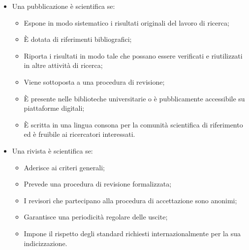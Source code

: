 \begin{itemize}
    \item Una pubblicazione è scientifica se:
        \begin{itemize}
            \item Espone in modo sistematico i risultati originali del lavoro di ricerca;
            \item È dotata di riferimenti bibliografici;
            \item Riporta i risultati in modo tale che possano essere verificati e riutilizzati in altre attività di ricerca;
            \item Viene sottoposta a una procedura di revisione;
            \item È presente nelle biblioteche universitarie o è pubblicamente accessibile su piattaforme digitali;
            \item È scritta in una lingua consona per la comunità scientifica di riferimento ed è fruibile 
            ai ricercatori interessati.

        \end{itemize}
    \item Una rivista è scientifica se:
        \begin{itemize}
            \item Aderisce ai criteri generali;
            \item Prevede una procedura di revisione formalizzata;
            \item I revisori che partecipano alla procedura di accettazione sono anonimi;
            \item Garantisce una periodicità regolare delle uscite;
            \item Impone il rispetto degli standard richiesti internazionalmente per la sua indicizzazione.

        \end{itemize}

\end{itemize}

